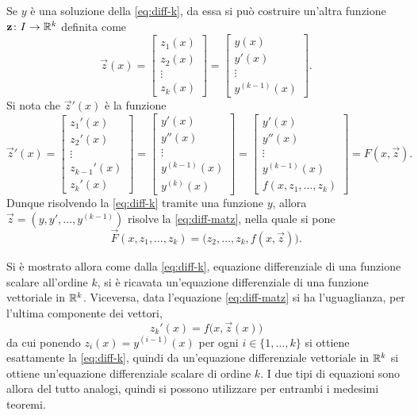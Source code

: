 Se $y$ è una soluzione della \eqref{eq:diff-k}, da essa si può costruire un'altra funzione $\mathbf{z}\colon I\to\mathbb{R}^k$ definita come
\[
\vec z(x)=
\begin{bmatrix}z_1(x)\\z_2(x)\\\vdots\\z_k(x)\end{bmatrix}=
\begin{bmatrix}y(x)\\y'(x)\\\vdots\\y^{(k-1)}(x)\end{bmatrix}.
\]
Si nota che $\vec z'(x)$ è la funzione
\begin{equation} \label{eq:diff-matz}
\vec z'(x)=
\begin{bmatrix}z_1'(x)\\z_2'(x)\\\vdots\\z_{k-1}'(x)\\z_k'(x)\end{bmatrix}=
\begin{bmatrix}y'(x)\\y''(x)\\\vdots\\y^{(k-1)}(x)\\y^{(k)}(x)\end{bmatrix}=
\begin{bmatrix}y'(x)\\y''(x)\\\vdots\\y^{(k-1)}(x)\\f(x,z_1,\dots,z_k)\end{bmatrix}=
F(x,\vec z).
\end{equation}
Dunque risolvendo la \eqref{eq:diff-k} tramite una funzione $y$, allora $\vec z=(y,y',\dots,y^{(k-1)})$ risolve la \eqref{eq:diff-matz}, nella quale si pone
\begin{equation} \label{eq:diff-F}
\vec F(x,z_1,\dots,z_k)=\big(z_2,\dots,z_k,f(x,\vec z)\big).
\end{equation}

Si è mostrato allora come dalla \eqref{eq:diff-k}, equazione differenziale di una funzione scalare all'ordine $k$, si è ricavata un'equazione differenziale di una funzione vettoriale in $\mathbb{R}^k$. Viceversa, data l'equazione \eqref{eq:diff-matz} si ha l'uguaglianza, per l'ultima componente dei vettori, 
\[
z_k'(x)=f\big(x,\vec z(x)\big)
\]
da cui ponendo $z_i(x)=y^{(i-1)}(x)$ per ogni $i\in\{1,\dots,k\}$ si ottiene esattamente la \eqref{eq:diff-k}, quindi da un'equazione differenziale vettoriale in $\mathbb{R}^k$ si ottiene un'equazione differenziale scalare di ordine $k$. I due tipi di equazioni sono allora del tutto analogi, quindi si possono utilizzare per entrambi i medesimi teoremi.

